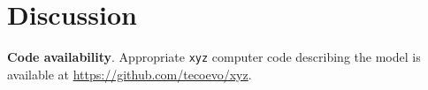 \documentclass{article}
\begin{document}
\section{Discussion}



\textbf{Code availability}.
Appropriate {\tt{xyz}} computer code describing the model is available at {\url{https://github.com/tecoevo/xyz}}.





%
\end{document}
